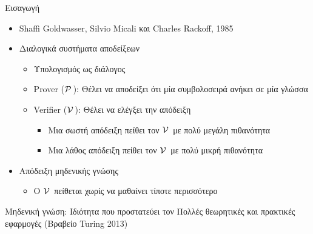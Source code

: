 \documentclass[10pt,handout]{beamer}
\begin{document}
\begin{frame}{Εισαγωγή}
\begin{itemize}
\item Shaffi Goldwasser, Silvio Micali και Charles Rackoff, 1985
\pause
\item Διαλογικά συστήματα αποδείξεων
\pause
\begin{itemize}
\item Υπολογισμός ως διάλογος
\pause
\item Prover ($\mathcal{P}\,$): Θέλει να αποδείξει ότι μία συμβολοσειρά ανήκει σε μία γλώσσα 
\pause
\item Verifier ($\mathcal{V}\,$): Θέλει να ελέγξει την απόδειξη
\pause
\begin{itemize}
\item Μια σωστή απόδειξη πείθει τον $\mathcal{V}\,$ με πολύ μεγάλη πιθανότητα
\item Μια λάθος απόδειξη πείθει τον $\mathcal{V}\,$ με πολύ μικρή πιθανότητα
\end{itemize}
\end{itemize}
\item Απόδειξη μηδενικής γνώσης
\begin{itemize}
\item Ο $\mathcal{V}\,$ πείθεται χωρίς να μαθαίνει τίποτε περισσότερο

\end{itemize}
\pause
\end{itemize}
\alert{Μηδενική γνώση:} Ιδιότητα που προστατεύει τον \prv
Πολλές θεωρητικές και πρακτικές εφαρμογές (Βραβείο Turing 2013)
\end{frame}
\end{document}
